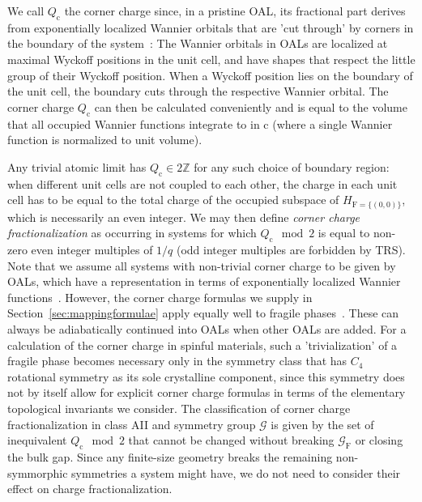 We call $Q_\mathrm{c}$ the corner charge since, in a pristine OAL, its fractional part derives from exponentially localized Wannier orbitals that are 'cut through' by corners in the boundary of the system~\cite{miertcorners,EzawaWannier19,benalcazar2018quantization}: The Wannier orbitals in OALs are localized at maximal Wyckoff positions in the unit cell, and have shapes that respect the little group of their Wyckoff position. When a Wyckoff position lies on the boundary of the unit cell, the boundary cuts through the respective Wannier orbital. The corner charge $Q_\mathrm{c}$ can then be calculated conveniently and is equal to the volume that all occupied Wannier functions integrate to in $\mathrm{c}$ (where a single Wannier function is normalized to unit volume).

Any trivial atomic limit has $Q_\mathrm{c} \in 2\mathbb{Z}$ for any such choice of boundary region: when different unit cells are not coupled to each other, the charge in each unit cell has to be equal to the total charge of the occupied subspace of $H_{\mathrm{F} = \{(0,0)\}}$, which is necessarily an even integer. We may then define \emph{corner charge fractionalization} as occurring in systems for which $Q_\mathrm{c} \mod 2$ is equal to non-zero even integer multiples of $1/q$ (odd integer multiples are forbidden by TRS). Note that we assume all systems with non-trivial corner charge to be given by OALs, which have a representation in terms of exponentially localized Wannier functions~\cite{MarziariWF2012, Bradlyn17}. However, the corner charge formulas we supply in Section~\ref{sec:mappingformulae} apply equally well to fragile phases~\cite{PhysRevLett.121.126402,BarryFragile,KoreanTBG,wieder2018axion,MaiaFragile1,MaiaFragile2,MaiaFragile3}. These can always be adiabatically continued into OALs when other OALs are added. For a calculation of the corner charge in spinful materials, such a 'trivialization' of a fragile phase becomes necessary only in the symmetry class that has $C_4$ rotational symmetry as its sole crystalline component, since this symmetry does not by itself allow for explicit corner charge formulas in terms of the elementary topological invariants we consider. The classification of corner charge fractionalization in class AII and symmetry group $\mathcal{G}$ is given by the set of inequivalent $Q_\mathrm{c} \mod 2$ that cannot be changed without breaking $\mathcal{G}_\mathrm{F}$ or closing the bulk gap. Since any finite-size geometry breaks the remaining non-symmorphic symmetries a system might have, we do not need to consider their effect on charge fractionalization. 

